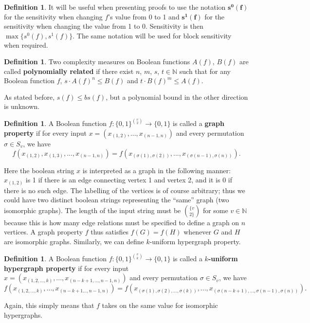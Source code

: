 \documentclass[psamsfonts]{amsart}
\theoremstyle{definition}
\newtheorem{defn}[theorem]{Definition}
\theoremstyle{remark}
\numberwithin{equation}{section}
\begin{document}
\begin{defn}\label{oneandzero}
It will be useful when presenting proofs to use the notation $\boldsymbol{s^{0}(f)}$ for the sensitivity when changing $f$'s value from 0 to 1 
and $\boldsymbol{s^{1}(f)}$ for the sensitivity when changing 
the value from 1 to 0.  Sensitivity is then $\max \{ s^{0}(f), s^{1}(f)\}$.  The same notation will be used for block sensitivity when required.  
\end{defn}

\begin{defn}
Two complexity measures on Boolean functions $A(f)$, $B(f)$ are called \textbf{polynomially related} if there exist $n$, $m$, $s$, $t \in \mathbb{N}$ such that 
for any Boolean function $f$, $s \cdot A(f)^{n} \leq B(f)$ and $t \cdot B(f)^{m} \leq A(f)$.  
\end{defn}

As stated before, $s(f) \leq bs(f)$, but a polynomial bound in the other direction is unknown.  

		\begin{defn}
	A Boolean function $f: \{0,1\}^{v \choose{2}} \to \{0,1\}$ is called a \textbf{graph property} if for every input $x = (x_{(1,2)},...,x_{(n-1,n)})$ and every permutation $\sigma \in S_v$, we have
			\begin{equation}
				f(x_{(1,2)},x_{(1,3)},...,x_{(n-1,n)}) = f(x_{(\sigma (1), \sigma (2))},...,x_{(\sigma (n-1), \sigma (n))}). \nonumber
			\end{equation}
		\end{defn}
Here the boolean string $x$ is interpreted as a graph in the following manner: $x_{(1,2)}$ is 1 if there is an edge connecting vertex 1 and vertex 2, and it is 0 if there is no such edge.  
The labelling of the vertices is of course arbitrary; thus we could have two distinct boolean strings representing the ``same'' graph (two isomorphic graphs).  The length of the input string 
must be $\{v \choose{2}\}$ for some $v \in \mathbb{N}$ because this is how many edge relations must be specified to define a graph on $n$ vertices.  A graph property $f$ thus satisfies $f(G) = f(H)$ whenever $G$ and $H$ are isomorphic graphs.	Similarly, we can define $k$-uniform hypergraph property.
			\begin{defn}
				A Boolean function $f: \{0,1\}^{v \choose{k}} \to \{0,1\}$ is called a \textbf{$k$-uniform hypergraph property} if for every input $x = (x_{(1,2,...,k)},...,x_{(n-k+1,...,n-1,n)})$ and every permutation $\sigma \in S_v$, we have
			\begin{equation}
				f(x_{(1,2,...,k)},...,x_{(n-k+1...,n-1,n)}) = f(x_{(\sigma (1), \sigma (2),..., \sigma(k))},...,x_{(\sigma (n-k+1),...,\sigma (n-1), \sigma (n))}). \nonumber
			\end{equation}
			\end{defn}
Again, this simply means that $f$ takes on the same value for isomorphic hypergraphs.
\end{document}
